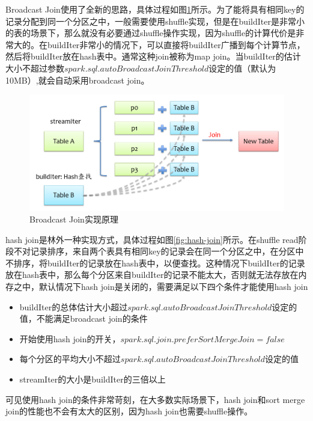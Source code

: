 Broadcast Join使用了全新的思路，具体过程如图\ref{fig:broadcast-join}所示。为了能将具有相同key的记录分配到同一个分区之中，一般需要使用shuffle实现，但是在buildIter是非常小的表的场景下，那么就没有必要通过shuffle操作实现，因为shuffle的计算代价是非常大的。在buildIter非常小的情况下，可以直接将buildIter广播到每个计算节点，然后将buildIter放在hash表中。通常这种join被称为map join。当buildIter的估计大小不超过参数$spark.sql.autoBroadcastJoinThreshold$设定的值（默认为10MB）,就会自动采用broadcast join。


\begin{figure}
    \centering
    \includegraphics[width=1\textwidth]{Img/spark-sql-broadcast-join.png}
    \caption{Broadcast Join实现原理}
    \label{fig:broadcast-join}
\end{figure}

hash join是林外一种实现方式，具体过程如图\ref{fig:hash-join}所示。在shuffle read阶段不对记录排序，来自两个表具有相同key的记录会在同一个分区之中，在分区中不排序，将buildIter的记录放在hash表中，以便查找。这种情况下buildIter的记录放在hash表中，那么每个分区来自buildIter的记录不能太大，否则就无法存放在内存之中，默认情况下hash join是关闭的，需要满足以下四个条件才能使用hash join

\begin{itemize}
    \item buildIter的总体估计大小超过$spark.sql.autoBroadcastJoinThreshold$设定的值，不能满足broadcast join的条件
    \item 开始使用hash join的开关，$spark.sql.join.preferSortMergeJoin=false$
    \item 每个分区的平均大小不超过$spark.sql.autoBroadcastJoinThreshold$设定的值
    \item streamIter的大小是buildIter的三倍以上
\end{itemize}

可见使用hash join的条件非常苛刻，在大多数实际场景下，hash join和sort merge join的性能也不会有太大的区别，因为hash join也需要shuffle操作。

